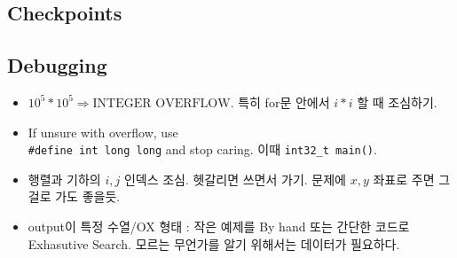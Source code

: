 \documentclass[landscape,8pt]{article}
\begin{document}
\begin{multicols}{2}
\columnbreak


\section{Checkpoints}
  \subsection{Debugging}
    \begin{itemize}
      \item $10^5 * 10^5 \Rightarrow \text{INTEGER OVERFLOW}$. 특히 for문 안에서 $i*i$ 할 때 조심하기.
      \item If unsure with overflow, use \\
      \texttt{\#define int long long} and stop caring. 이때 \texttt{int32\_t main()}.
      \item 행렬과 기하의 $i, j$ 인덱스 조심. 헷갈리면 쓰면서 가기. 문제에 $x, y$ 좌표로 주면 그걸로 가도 좋을듯.
      \item output이 특정 수열/OX 형태 : 작은 예제를 By hand 또는 간단한 코드로 Exhasutive Search. 모르는 무언가를 알기 위해서는 데이터가 필요하다.
    \end{itemize}

\end{multicols}
\end{document}
